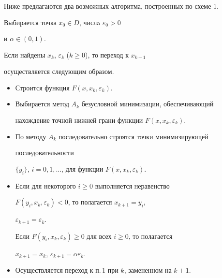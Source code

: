 Ниже предлагаются два возможных алгоритма, построенных по схеме 1.





\begin{alg}


Выбирается точка $x_0\in D$, числa $\varepsilon_0>0$


и $\alpha\in (0,1)$.


 


Если найдены $x_k$, $\varepsilon_k$ ($k\geq0$), то переход к $x_{k+1}$


осуществляется следующим образом.


\begin{itemize}


\item[1.] Строится функция $F(x,x_k,\varepsilon_k)$.


\item[2.] Выбирается метод $A_k$ безусловной минимизации, обеспечивающий


нахождение точной нижней грани функции $F(x,x_k,\varepsilon_k)$.


\item[3.] По методу $A_k$ последовательно строятся точки минимизирующей


последовательности


$\{y_i\}$, $i=0,1,\dotsc$, для функции $F(x,x_k,\varepsilon_k)$.


\item[4.] Если для некоторого $i\ge0$ выполняется неравенство


$F(y_i,x_k,\varepsilon_k)<0$, то полагается $x_{k+1}=y_i$,


$\varepsilon_{k+1}=\varepsilon_k$.


Если $F(y_i,x_k,\varepsilon_k)\ge0$ для всех $i\ge0$, то полагается


$x_{k+1}=x_k$, $\varepsilon_{k+1}=\alpha\varepsilon_k$.


\item[5.] Осуществляется переход к п.\,1 при $k$, замененном на $k+1$.


\end{itemize}


\end{alg}





